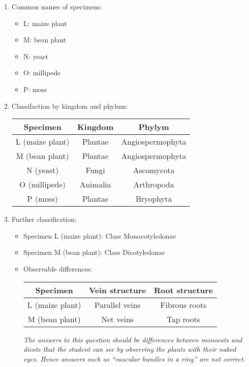 \begin{enumerate}

\item{Common names of specimens:}
\begin{itemize}
\item{L: maize plant}
\item{M: bean plant}
\item{N: yeast}
\item{O: millipede}
\item{P: moss}
\end{itemize}


\item{Classifaction by kingdom and phylum:}

\begin{center}
\begin{tabular}{| c | c | c |}
\hline
Specimen & Kingdom & Phylym \\ \hline
L (maize plant) & Plantae & Angiospermophyta \\ \hline
M (bean plant) & Plantae & Angiospermophyta \\ \hline
N (yeast) & Fungi & Ascomycota \\ \hline
O (millipede) & Animalia & Arthropoda \\ \hline
P (moss) & Plantae & Bryophyta \\ \hline
\hline
\end{tabular}
\end{center}

\item{Further classification:}
\begin{itemize}
\item{Specimen L (maize plant): Class Monocotyledonae}
\item{Specimen M (bean plant): Class Dicotyledonae}
\item{Observable differences:}

\begin{center}
\begin{tabular}{| c | c | c |}
\hline
Specimen & Vein structure & Root structure \\ \hline
L (maize plant) & Parallel veins & Fibrous roots \\ \hline
M (bean plant) & Net veins & Tap roots \\ \hline
\hline
\end{tabular}
\end{center}

\textit{The answers to this question should be differences between monocots and dicots that the student can see by observing the plants with their naked eyes. Hence answers such as ``vascular bundles in a ring'' are not correct.}


\end{itemize}
\end{enumerate}
